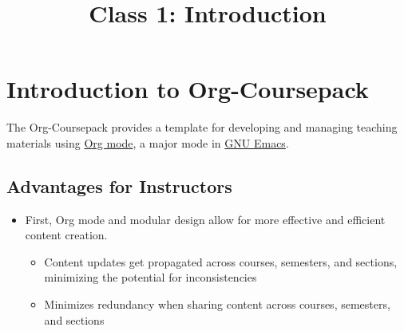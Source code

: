 \documentclass[10pt,article]{article}
\date{\vspace{-6ex}}
\title{Class 1: Introduction}
\begin{document}
\maketitle
{} 
\thispagestyle{fancy}

\setcounter{tocdepth}{1}
\tableofcontents
\vspace{6ex}

\section{Introduction to Org-Coursepack}
\label{sec:org9bff693}
The Org-Coursepack provides a template for developing and managing teaching
materials using \href{https://orgmode.org/manual/Export-settings.html}{Org mode}, a major mode in \href{https://www.gnu.org/software/emacs/manual/html\_node/emacs/Specifying-File-Variables.html\#Specifying-File-Variables}{GNU Emacs}.
\subsection{Advantages for Instructors}
\label{sec:orgbf83241}
\begin{itemize}
\item First, Org mode and modular design allow for more effective and efficient
content creation.
\begin{itemize}
\item Content updates get propagated across courses, semesters, and sections,
minimizing the potential for inconsistencies
\item Minimizes redundancy when sharing content across courses, semesters, and
sections
\end{itemize}
\end{itemize}
\end{document}
